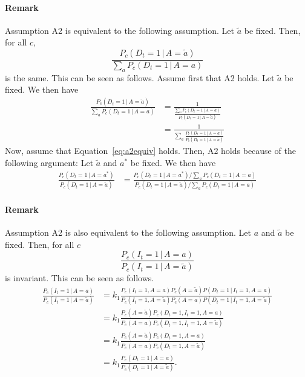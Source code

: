 \documentclass[a4paper]{article}
\begin{document}
\paragraph{Remark}
Assumption A2 is equivalent to the following assumption. Let $\tilde{a}$ be fixed. Then, for all $c$,
\begin{equation} \label{eq:a2equiv}
\frac{P_c(D_t = 1\,|\,A = \tilde{a})}
{\sum_a P_c(D_t = 1\,|\,A = a)}
\end{equation}
is the same.
{\color{gray} This can be seen as follows. Assume first that 
A2 holds. Let $\tilde{a}$ be fixed. We then have 
\begin{align*}
\frac{P_c(D_t = 1\,|\,A = \tilde{a})}
{\sum_a P_c(D_t = 1\,|\,A = a)}
&= 
\frac{1}{\frac{\sum_a P_c(D_t = 1\,|\,A = a)}{P_c(D_t = 1\,|\,A = \tilde{a})}
}\\
&= 
\frac{1}{\sum_a \frac{P_c(D_t = 1\,|\,A = a)}{P_c(D_t = 1\,|\,A = \tilde{a})}
}
\end{align*}
Now, assume that Equation~\eqref{eq:a2equiv} holds. Then, A2 holds because of the following argument:  Let $\tilde{a}$ and $a^*$ be fixed. We then have
\begin{align*}
\frac{P_c(D_t = 1\,|\,A = a^*)}
{P_c(D_t = 1\,|\,A = \tilde{a})}
&= 
\frac{P_c(D_t = 1\,|\,A = a^*)/\sum_a P_c(D_t = 1\,|\,A = a)
}
{P_c(D_t = 1\,|\,A = \tilde{a})/\sum_a P_c(D_t = 1\,|\,A = a)
}
\end{align*}}

\paragraph{Remark}
Assumption A2 is also equivalent to the following assumption. 
Let $a$ and $\tilde{a}$ be fixed. Then, for all $c$
\begin{equation}
\frac{P_c(I_t = 1\,|\,A = a)}{P_c(I_t = 1\,|\,A = \tilde{a})} 
\end{equation}
is invariant.
{\color{gray} This can be seen as follows.
\begin{align*}
\frac{P_c(I_t = 1\,|\,A = a)}{P_c(I_t = 1\,|\,A = \tilde{a})} 
&= k_1
\frac{P_c(I_t = 1,A = a)P_c(A = \tilde{a})
P(D_t = 1\,|\,I_t = 1, A = a)}
{P_c(I_t = 1,A = \tilde{a})P_c(A = a)P(D_t = 1\,|\,I_t = 1, A = \tilde{a})} \\
&= k_1
\frac{P_c(A = \tilde{a})
P_c(D_t = 1,I_t = 1, A = a)}
{P_c(A = a)P_c(D_t = 1,I_t = 1, A = \tilde{a})}\\
&= k_1
\frac{P_c(A = \tilde{a})
P_c(D_t = 1,A = a)}
{P_c(A = a)P_c(D_t = 1, A = \tilde{a})}\\
&= k_1
\frac{P_c(D_t = 1\,|\,A = a)}
{P_c(D_t = 1\,|\, A = \tilde{a})}.
\end{align*}
}
\end{document}
